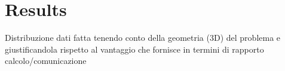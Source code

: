 \section{Results}
Distribuzione dati fatta tenendo conto della geometria (3D) del problema e giustificandola rispetto al vantaggio che fornisce in termini di rapporto calcolo/comunicazione
